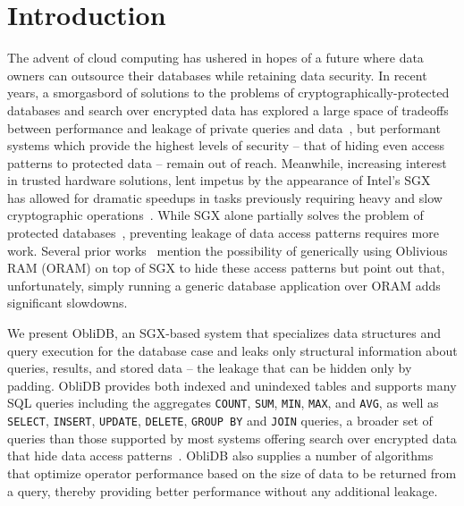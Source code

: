 \documentclass[letterpaper,twocolumn,10pt]{article}
\def\name/{ObliDB}
\begin{document}
\section{Introduction}

The advent of cloud computing has ushered in hopes of a future where data owners can outsource their databases while retaining data security. In recent years, a smorgasbord of solutions to the problems of cryptographically-protected databases and search over encrypted data has explored a large space of tradeoffs between performance and leakage of private queries and data~\cite{FVY+17}, but performant systems which provide the highest levels of security -- that of hiding even access patterns to protected data -- remain out of reach. Meanwhile, increasing interest in trusted hardware solutions, lent impetus by the appearance of Intel's SGX~\cite{CD16} has allowed for dramatic speedups in tasks previously requiring heavy and slow cryptographic operations~\cite{FVBG16, NFR+17}. While SGX alone partially solves the problem of protected databases~\cite{FBB+17}, preventing leakage of data access patterns requires more work. Several prior works~\cite{PBP16, DPP+16, FVY+17} mention the possibility of generically using Oblivious RAM (ORAM) on top of SGX to hide these access patterns but point out that, unfortunately, simply running a generic database application over ORAM adds significant slowdowns.

We present \name/, an SGX-based system that specializes data structures and query execution for the database case and leaks only structural information about queries, results, and stored data -- the leakage that can be hidden only by padding. \name/ provides both indexed and unindexed tables and supports many SQL queries including the aggregates \texttt{COUNT}, \texttt{SUM}, \texttt{MIN}, \texttt{MAX}, and \texttt{AVG}, as well as \texttt{SELECT}, \texttt{INSERT}, \texttt{UPDATE}, \texttt{DELETE}, \texttt{GROUP BY} and \texttt{JOIN} queries, a broader set of queries than those supported by most systems offering search over encrypted data that hide data access patterns~\cite{FVY+17}. \name/ also supplies a number of algorithms that optimize operator performance based on the size of data to be returned from a query, thereby providing better performance without any additional leakage. 
\end{document}
